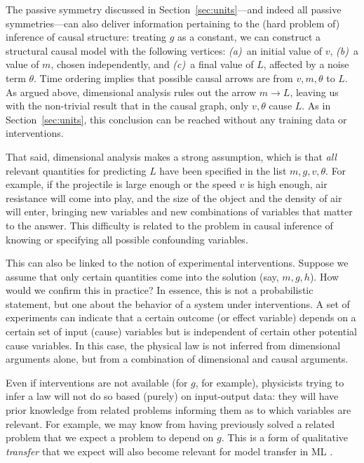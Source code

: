 \documentclass[preprint]{article} %
\newcommand{\sectionname}{Section}
\newcommand{\secref}[1]{\sectionname~\ref{#1}}
\begin{document}
The passive symmetry discussed in \secref{sec:units}---and indeed all passive symmetries---can also deliver information pertaining to the (hard problem of) inference of causal structure:
treating $g$ as a constant, we can construct a structural causal model with the following vertices: \textsl{(a)}~an initial value of $v$, \textsl{(b)}~a value of $m$, chosen independently, and \textsl{(c)}~a final value of $L$, affected by a noise term $\theta$.
Time ordering implies that possible causal arrows are from $v, m, \theta$ to $L$.
As argued above, dimensional analysis rules out the arrow $m\to L$, leaving us with the non-trivial result that in the causal graph, only $v,\theta$ cause $L$.
As in \secref{sec:units}, this conclusion can be reached without any training data or interventions.

That said, dimensional analysis makes a strong assumption, which is that \emph{all} relevant quantities for predicting $L$ have been specified in the list $m, g, v, \theta$.
For example, if the projectile is large enough or the speed $v$ is high enough, air resistance will come into play, and the size of the object and the density of air will enter, bringing new variables and new combinations of variables that matter to the answer.
This difficulty is related to the problem in causal inference of knowing or specifying all possible confounding variables.

This can also be linked to the notion of experimental interventions. Suppose we assume that only certain quantities come into the solution (say, $m, g, h$). How would we confirm this in practice? In essence, this is not a probabilistic statement, but one about the behavior of a system under interventions. A set of experiments can indicate that a certain outcome (or effect variable) depends on a certain set of input (cause) variables but is independent of certain other potential cause variables. In this case, the physical law is not inferred from dimensional arguments alone, but from a combination of dimensional and causal arguments.

Even if interventions are not available (for $g$, for example), physicists trying to infer a law will not do so based (purely) on input-output data: they will have prior knowledge from related problems informing them as to which variables are relevant. For example, we may know from having previously solved a related problem that we expect a problem to depend on $g$.
This is a form of qualitative \emph{transfer} that we expect will also become relevant for model transfer in ML \citep{RojSchTurPet18}.
\end{document}
